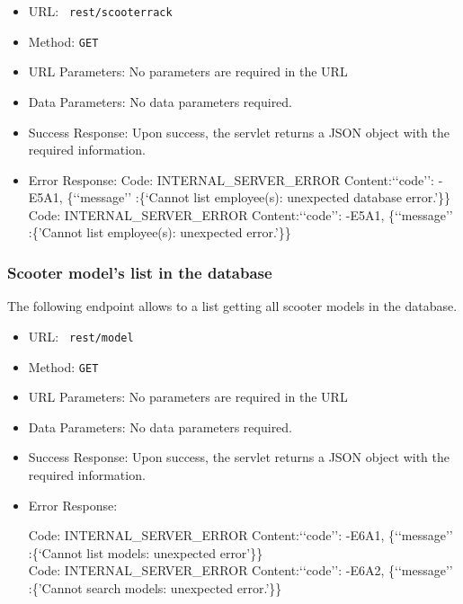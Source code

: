 \begin{itemize}
    \item URL: \texttt{ rest/scooterrack}
    \item Method: \texttt{GET}
    \item URL Parameters: No parameters are required in the URL
    \item Data Parameters: No data parameters required.
    \item Success Response: Upon success, the servlet returns a JSON object with the required information.
    \item Error Response:
Code: INTERNAL\_SERVER\_ERROR \newline
Content:‘‘code’’: -E5A1, \{‘‘message’’ :\{‘Cannot list employee(s): unexpected database error.'\}\} \\
Code: INTERNAL\_SERVER\_ERROR \newline
Content:‘‘code’’: -E5A1, \{‘‘message’’ :\{'Cannot list employee(s): unexpected error.'\}\}
    
\end{itemize}

\subsubsection*{ Scooter model's list in the database}
The following endpoint allows to a list getting all scooter models in the database.

\begin{itemize}
    \item URL: \texttt{ rest/model}
    \item Method: \texttt{GET}
    \item URL Parameters: No parameters are required in the URL
    \item Data Parameters: No data parameters required.
    \item Success Response: Upon success, the servlet returns a JSON object with the required information.
    \item Error Response: 

Code: INTERNAL\_SERVER\_ERROR \newline
Content:‘‘code’’: -E6A1, \{‘‘message’’ :\{‘Cannot list models: unexpected error'\}\}
\\
Code: INTERNAL\_SERVER\_ERROR \newline
Content:‘‘code’’: -E6A2, \{‘‘message’’ :\{'Cannot search models: unexpected error.'\}\}
    
\end{itemize}



